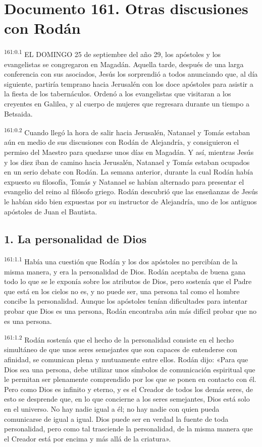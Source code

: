 \chapter{Documento 161. Otras discusiones con Rodán}
\par 
\textsuperscript{161:0.1} EL DOMINGO 25 de septiembre del año 29, los apóstoles y los evangelistas se congregaron en Magadán. Aquella tarde, después de una larga conferencia con sus asociados, Jesús los sorprendió a todos anunciando que, al día siguiente, partiría temprano hacia Jerusalén con los doce apóstoles para asistir a la fiesta de los tabernáculos. Ordenó a los evangelistas que visitaran a los creyentes en Galilea, y al cuerpo de mujeres que regresara durante un tiempo a Betsaida.

\par 
\textsuperscript{161:0.2} Cuando llegó la hora de salir hacia Jerusalén, Natanael y Tomás estaban aún en medio de sus discusiones con Rodán de Alejandría, y consiguieron el permiso del Maestro para quedarse unos días en Magadán. Y así, mientras Jesús y los diez iban de camino hacia Jerusalén, Natanael y Tomás estaban ocupados en un serio debate con Rodán. La semana anterior, durante la cual Rodán había expuesto su filosofía, Tomás y Natanael se habían alternado para presentar el evangelio del reino al filósofo griego. Rodán descubrió que las enseñanzas de Jesús le habían sido bien expuestas por su instructor de Alejandría, uno de los antiguos apóstoles de Juan el Bautista.

\section*{1. La personalidad de Dios}
\par 
\textsuperscript{161:1.1} Había una cuestión que Rodán y los dos apóstoles no percibían de la misma manera, y era la personalidad de Dios. Rodán aceptaba de buena gana todo lo que se le exponía sobre los atributos de Dios, pero sostenía que el Padre que está en los cielos no es, y no puede ser, una persona tal como el hombre concibe la personalidad. Aunque los apóstoles tenían dificultades para intentar probar que Dios es una persona, Rodán encontraba aún más difícil probar que no es una persona.

\par 
\textsuperscript{161:1.2} Rodán sostenía que el hecho de la personalidad consiste en el hecho simultáneo de que unos seres semejantes que son capaces de entenderse con afinidad, se comunican plena y mutuamente entre ellos. Rodán dijo: «Para que Dios sea una persona, debe utilizar unos símbolos de comunicación espiritual que le permitan ser plenamente comprendido por los que se ponen en contacto con él. Pero como Dios es infinito y eterno, y es el Creador de todos los demás seres, de esto se desprende que, en lo que concierne a los seres semejantes, Dios está solo en el universo. No hay nadie igual a él; no hay nadie con quien pueda comunicarse de igual a igual. Dios puede ser en verdad la fuente de toda personalidad, pero como tal trasciende la personalidad, de la misma manera que el Creador está por encima y más allá de la criatura».


